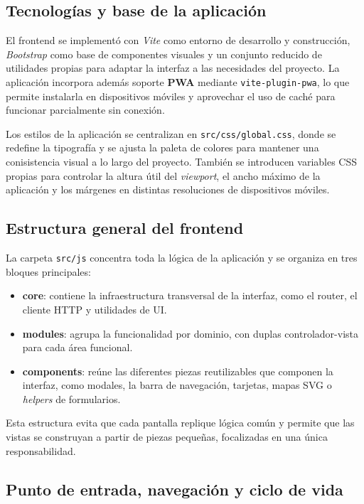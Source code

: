 \subsection{Tecnologías y base de la aplicación}

El frontend se implementó con \textit{Vite} como entorno de desarrollo y construcción, \textit{Bootstrap} como base de componentes visuales y un conjunto reducido de utilidades propias para adaptar la interfaz a las necesidades del proyecto. La aplicación incorpora además soporte \textbf{PWA} mediante \texttt{vite-plugin-pwa}, lo que permite instalarla en dispositivos móviles y aprovechar el uso de caché para funcionar parcialmente sin conexión.

Los estilos de la aplicación se centralizan en \texttt{src/css/global.css}, donde se redefine la tipografía y se ajusta la paleta de colores para mantener una conisistencia visual a lo largo del proyecto. También se introducen variables CSS propias para controlar la altura útil del \textit{viewport}, el ancho máximo de la aplicación y los márgenes en distintas resoluciones de dispositivos móviles.

\subsection{Estructura general del frontend}

La carpeta \texttt{src/js} concentra toda la lógica de la aplicación y se organiza en tres bloques principales:

\begin{itemize}
  \item \textbf{core}: contiene la infraestructura transversal de la interfaz, como el router, el cliente HTTP y utilidades de UI.
  \item \textbf{modules}: agrupa la funcionalidad por dominio, con duplas controlador-vista para cada área funcional.
  \item \textbf{components}: reúne las diferentes piezas reutilizables que componen la interfaz, como modales, la barra de navegación, tarjetas, mapas SVG o \textit{helpers} de formularios.
\end{itemize}

Esta estructura evita que cada pantalla replique lógica común y permite que las vistas se construyan a partir de piezas pequeñas, focalizadas en una única responsabilidad.

\subsection{Punto de entrada, navegación y ciclo de vida}

